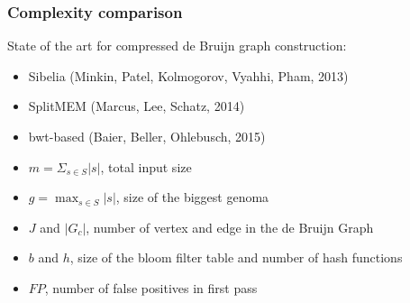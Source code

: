 \begin{frame}
	\frametitle{Complexity comparison}
	
	\centering
	
	
  State of the art for compressed de Bruijn graph construction:
  
	  \begin{itemize}
	    \item Sibelia (Minkin, Patel, Kolmogorov, Vyahhi, Pham, 2013)
	    \item SplitMEM (Marcus, Lee, Schatz, 2014)
	    \item bwt-based (Baier, Beller, Ohlebusch, 2015)
	  \end{itemize}

	  \pause	
	
	  \medskip
	  
        
    \medskip

	
    \begin{itemize}
      \item $m = \Sigma_{s \in S}{ |s| }$, total input size
      \item $g = \max_{s \in S}{ |s| }$, size of the biggest genoma
      \item $J$ and $|G_{c}|$, number of vertex and edge in the de Bruijn Graph
      \item $b$ and $h$, size of the bloom filter table and number of hash functions
      \item $FP$, number of false positives in first pass
    \end{itemize}
    

\end{frame}

